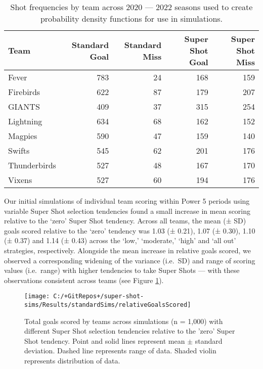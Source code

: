 \documentclass[]{elsarticle} %
\begin{document}
\begin{table}

\caption{\label{tab:shotFrequencyTable}Shot frequencies by team across 2020 — 2022 seasons used to create probability density functions for use in simulations.}
\centering
\begin{tabular}[t]{lrrrr}
\toprule
Team & Standard Goal & Standard Miss & Super Shot Goal & Super Shot Miss\\
\midrule
Fever & 783 & 24 & 168 & 159\\
Firebirds & 622 & 87 & 179 & 207\\
GIANTS & 409 & 37 & 315 & 254\\
Lightning & 634 & 68 & 162 & 152\\
Magpies & 590 & 47 & 159 & 140\\
\addlinespace
Swifts & 545 & 62 & 201 & 176\\
Thunderbirds & 527 & 48 & 167 & 170\\
Vixens & 527 & 60 & 194 & 176\\
\bottomrule
\end{tabular}
\end{table}

Our initial simulations of individual team scoring within Power 5
periods using variable Super Shot selection tendencies found a small
increase in mean scoring relative to the `zero' Super Shot tendency.
Across all teams, the mean (± SD) goals scored relative to the `zero'
tendency was 1.03 (± 0.21), 1.07 (± 0.30), 1.10 (± 0.37) and 1.14 (±
0.43) across the `low,' `moderate,' `high' and `all out' strategies,
respectively. Alongside the mean increase in relative goals scored, we
observed a corresponding widening of the variance (i.e.~SD) and range of
scoring values (i.e.~range) with higher tendencies to take Super Shots
--- with these observations consistent across teams (see Figure
\ref{fig:standardSimsRelativeGoalsScored}).

\begin{figure}

{\centering \texttt{[image: C:/+GitRepos+/super-shot-sims/Results/standardSims/relativeGoalsScored]} 

}

\caption{Total goals scored by teams across simulations (n = 1,000) with different Super Shot selection tendencies relative to the 'zero' Super Shot tendency. Point and solid lines represent mean $\pm$ standard deviation. Dashed line represents range of data. Shaded violin represents distribution of data.}\label{fig:standardSimsRelativeGoalsScored}
\end{figure}
\end{document}

